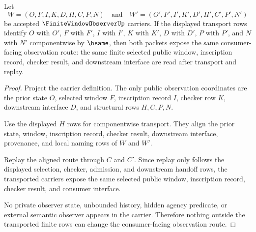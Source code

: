 \begin{theorem}
\label{thm:finite-window-observer-carrier-transport}
Let
$$
W=(O,F,I,K,D,H,C,P,N)
\quad\text{and}\quad
W'=(O',F',I',K',D',H',C',P',N')
$$
be accepted $\FiniteWindowObserverUp$ carriers. If the displayed transport rows identify $O$ with $O'$, $F$ with $F'$, $I$ with $I'$, $K$ with $K'$, $D$ with $D'$, $P$ with $P'$, and $N$ with $N'$ componentwise by $\hsame$, then both packets expose the same consumer-facing observation route: the same finite selected public window, inscription record, checker result, and downstream interface are read after transport and replay.
\end{theorem}
\begin{proof}
Project the carrier definition. The only public observation coordinates are the prior state $O$, selected window $F$, inscription record $I$, checker row $K$, downstream interface $D$, and structural rows $H,C,P,N$.

Use the displayed $H$ rows for componentwise transport. They align the prior state, window, inscription record, checker result, downstream interface, provenance, and local naming rows of $W$ and $W'$.

Replay the aligned route through $C$ and $C'$. Since replay only follows the displayed selection, checker, admission, and downstream handoff rows, the transported carriers expose the same selected public window, inscription record, checker result, and consumer interface.

No private observer state, unbounded history, hidden agency predicate, or external semantic observer appears in the carrier. Therefore nothing outside the transported finite rows can change the consumer-facing observation route.
\end{proof}

